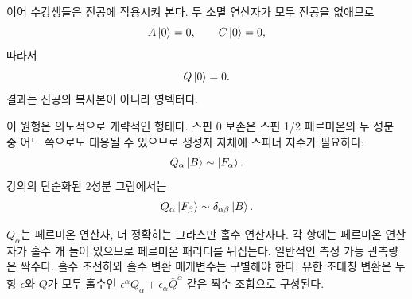\begin{classroomqa}
\end{classroomqa}

이어 수강생들은 진공에 작용시켜 본다. 두 소멸 연산자가 모두 진공을 없애므로
\begin{equation}
A\left\lvert0\right\rangle=0,\qquad C\left\lvert0\right\rangle=0,
\end{equation}
따라서
\begin{equation}
Q\left\lvert0\right\rangle=0.
\end{equation}
결과는 진공의 복사본이 아니라 영벡터다.

이 원형은 의도적으로 개략적인 형태다. 스핀 0 보손은 스핀 1/2 페르미온의 두 성분 중 어느 쪽으로도 대응될 수 있으므로 생성자 자체에 스피너 지수가 필요하다:
\begin{equation}
Q_\alpha\left\lvert B\right\rangle\sim\left\lvert F_\alpha\right\rangle.
\end{equation}
강의의 단순화된 2성분 그림에서는
\begin{equation}
Q_\alpha\left\lvert F_\beta\right\rangle\sim\delta_{\alpha\beta}\left\lvert B\right\rangle.
\end{equation}

\begin{classroomqa}
\end{classroomqa}

\(Q_\alpha\)는 페르미온 연산자, 더 정확히는 그라스만 홀수 연산자다. 각 항에는 페르미온 연산자가 홀수 개 들어 있으므로 페르미온 패리티를 뒤집는다. 일반적인 측정 가능 관측량은 짝수다. 홀수 초전하와 홀수 변환 매개변수는 구별해야 한다. 유한 초대칭 변환은 두 항 \(\epsilon\)와 \(Q\)가 모두 홀수인 \(\epsilon^\alpha Q_\alpha+\bar\epsilon_{\dot\alpha}\bar Q^{\dot\alpha}\) 같은 짝수 조합으로 구성된다. 


